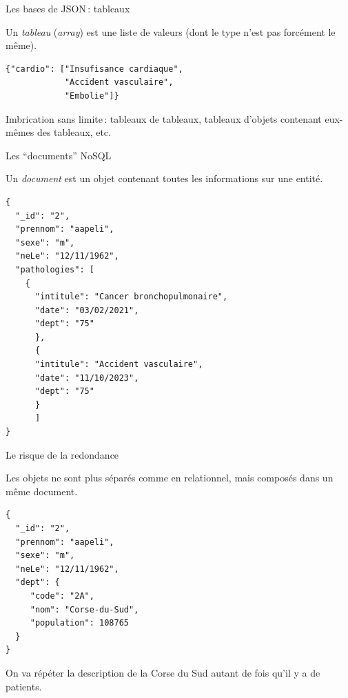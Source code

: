 \begin{frame}{Les bases de JSON\,: tableaux}


Un \textit{tableau} (\textit{array}) est une liste 
 de valeurs (dont le type n'est pas forcément le même).

\begin{verbatim}
{"cardio": ["Insufisance cardiaque", 
            "Accident vasculaire", 
            "Embolie"]}
\end{verbatim}

\vfill

Imbrication sans limite\,: tableaux de tableaux, tableaux d'objets contenant eux-mêmes des tableaux, etc.


\end{frame}

\begin{frame}{Les ``documents'' NoSQL}

Un \textit{document} est un objet contenant toutes les informations sur une entité.
\begin{verbatim}
{
  "_id": "2",
  "prennom": "aapeli",
  "sexe": "m",
  "neLe": "12/11/1962",
  "pathologies": [
    {
      "intitule": "Cancer bronchopulmonaire",
      "date": "03/02/2021",
      "dept": "75"
      },
      {
      "intitule": "Accident vasculaire",
      "date": "11/10/2023",
      "dept": "75"
      }
      ]
}
\end{verbatim}

\end{frame}


\begin{frame}{Le risque de la redondance}

Les objets ne sont plus séparés comme en relationnel, mais composés
dans un même document.


\begin{verbatim}
{
  "_id": "2",
  "prennom": "aapeli",
  "sexe": "m",
  "neLe": "12/11/1962",
  "dept": {
     "code": "2A",
     "nom": "Corse-du-Sud",
     "population": 108765
  }
}
\end{verbatim}

\vfill
On va répéter la description de la Corse du Sud autant de fois qu'il y a de patients.


\end{frame}


